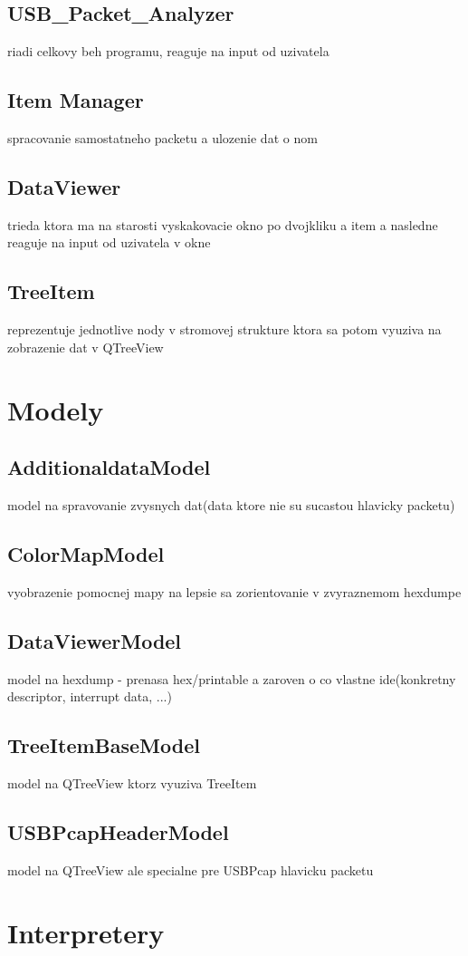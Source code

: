 \subsection{USB\_Packet\_Analyzer}
riadi celkovy beh programu, reaguje na input od uzivatela
\subsection{Item Manager}
spracovanie samostatneho packetu a ulozenie dat o nom
\subsection{DataViewer}
trieda ktora ma na starosti vyskakovacie okno po dvojkliku a item a nasledne reaguje na input od uzivatela v okne
\subsection{TreeItem}
reprezentuje jednotlive nody v stromovej strukture ktora sa potom vyuziva na zobrazenie dat v QTreeView
\section{Modely}
\subsection{AdditionaldataModel}
model na spravovanie zvysnych dat(data ktore nie su sucastou hlavicky packetu)
\subsection{ColorMapModel}
vyobrazenie pomocnej mapy na lepsie sa zorientovanie v zvyraznemom hexdumpe
\subsection{DataViewerModel}
model na hexdump - prenasa hex/printable a zaroven o co vlastne ide(konkretny descriptor, interrupt data, ...)
\subsection{TreeItemBaseModel}
model na QTreeView ktorz vyuziva TreeItem
\subsection{USBPcapHeaderModel}
model na QTreeView ale specialne pre USBPcap hlavicku packetu
\section{Interpretery}
